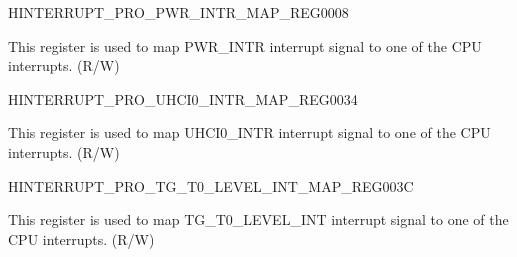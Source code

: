 



\begin{register}{H}{INTERRUPT\_PRO\_PWR\_INTR\_MAP\_REG}{\hexprefix{}0008}\label{regdesc:INTERRUPTPROPWRINTRMAPREG}
%
%
\regnewline%
\begin{regdesc}\begin{reglist}
\label{fielddesc:INTERRUPTPROPWRINTRMAP}\item [INTERRUPT\_PRO\_PWR\_INTR\_MAP] This register is used to map PWR\_INTR interrupt signal to one of the CPU interrupts. (R/W)
\end{reglist}\end{regdesc}
\end{register}






















\begin{register}{H}{INTERRUPT\_PRO\_UHCI0\_INTR\_MAP\_REG}{\hexprefix{}0034}\label{regdesc:INTERRUPTPROUHCI0INTRMAPREG}
%
%
\regnewline%
\begin{regdesc}\begin{reglist}
\label{fielddesc:INTERRUPTPROUHCI0INTRMAP}\item [INTERRUPT\_PRO\_UHCI0\_INTR\_MAP] This register is used to map UHCI0\_INTR interrupt signal to one of the CPU interrupts. (R/W)
\end{reglist}\end{regdesc}
\end{register}




\begin{register}{H}{INTERRUPT\_PRO\_TG\_T0\_LEVEL\_INT\_MAP\_REG}{\hexprefix{}003C}\label{regdesc:INTERRUPTPROTGT0LEVELINTMAPREG}
%
%
\regnewline%
\begin{regdesc}\begin{reglist}
\label{fielddesc:INTERRUPTPROTGT0LEVELINTMAP}\item [INTERRUPT\_PRO\_TG\_T0\_LEVEL\_INT\_MAP] This register is used to map TG\_T0\_LEVEL\_INT interrupt signal to one of the CPU interrupts. (R/W)
\end{reglist}\end{regdesc}
\end{register}


